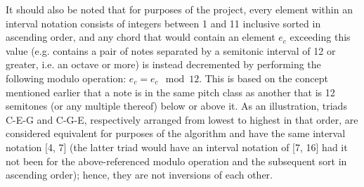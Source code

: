 \documentclass[twoside]{article}
\begin{document}
	It should also be noted that for purposes of the project, every element within an interval notation consists of integers between 1 and 11 inclusive sorted in ascending order, and any chord that would contain an element $e_c$ exceeding this value (e.g. contains a pair of notes separated by a semitonic interval of 12 or greater, i.e. an octave or more) is instead decremented by performing the following modulo operation: $e_c = e_c \mod 12$. This is based on the concept mentioned earlier that a note is in the same pitch class as another that is 12 semitones (or any multiple thereof) below or above it. As an illustration, triads C-E-G and C-G-E, respectively arranged from lowest to highest in that order, are considered equivalent for purposes of the algorithm and have the same interval notation [4, 7] (the latter triad would have an interval notation of [7, 16] had it not been for the above-referenced modulo operation and the subsequent sort in ascending order); hence, they are not inversions of each other.
\end{document}
